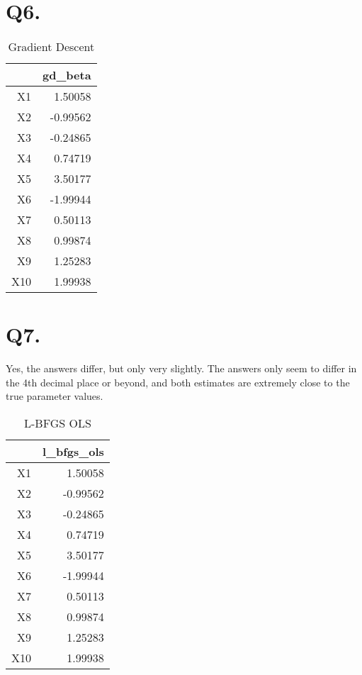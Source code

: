 \documentclass{article}
\begin{document}
\section*{Q6.}

\begin{table}[H]
\centering
\caption{Gradient Descent} 
\begin{tabular}{rr}
  \hline
 & gd\_beta \\ 
  \hline
X1 & 1.50058 \\ 
  X2 & -0.99562 \\ 
  X3 & -0.24865 \\ 
  X4 & 0.74719 \\ 
  X5 & 3.50177 \\ 
  X6 & -1.99944 \\ 
  X7 & 0.50113 \\ 
  X8 & 0.99874 \\ 
  X9 & 1.25283 \\ 
  X10 & 1.99938 \\ 
   \hline
\end{tabular}
\end{table}

\section*{Q7.}

Yes, the answers differ, but only very slightly. The answers only seem to differ in the 4th decimal place or beyond, and both estimates are extremely close to the true parameter values.

\begin{table}[H]
\centering
\caption{L-BFGS OLS} 
\begin{tabular}{rr}
  \hline
 & l\_bfgs\_ols \\ 
  \hline
X1 & 1.50058 \\ 
  X2 & -0.99562 \\ 
  X3 & -0.24865 \\ 
  X4 & 0.74719 \\ 
  X5 & 3.50177 \\ 
  X6 & -1.99944 \\ 
  X7 & 0.50113 \\ 
  X8 & 0.99874 \\ 
  X9 & 1.25283 \\ 
  X10 & 1.99938 \\ 
   \hline
\end{tabular}
\end{table}
\end{document}

